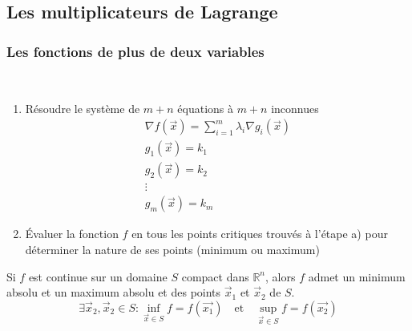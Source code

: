 \subsection{Les multiplicateurs de Lagrange}
	\subsubsection{Les fonctions de plus de deux variables}
	
	\begin{mythm}~
		\begin{enumerate}[label=\alph*)]
			\item Résoudre le système de $m+n$ équations à $m+n$ inconnues 
			\begin{gather*}
			\nabla f(\vec{x})=\sum_{i=1}^{m}\lambda_i\nabla g_i(\vec{x})\\
			g_1(\vec{x})=k_1\\
			g_2(\vec{x})=k_2\\
			\vdots\\
			g_m(\vec{x})=k_m		
			\end{gather*}
			\item Évaluer la fonction $f$ en tous les points critiques trouvés à l'étape a) pour déterminer la nature de ses points (minimum ou maximum)
		\end{enumerate} 
	\end{mythm}
\begin{mythm}
	Si $f$ est continue sur un domaine $S$ compact dans $\mathbb{R}^n$, alors $f$ admet un minimum absolu et un maximum absolu et des points $\vec{x}_1$ et $\vec{x}_2$ de $S$.
	\[\exists\vec{x}_2,\vec{x}_2\in S : \inf\limits_{\vec{x}\in S} f =f(\vec{x_1})\quad\text{et}\quad \sup\limits_{\vec{x}\in S} f =f(\vec{x_2}) \]
\end{mythm}